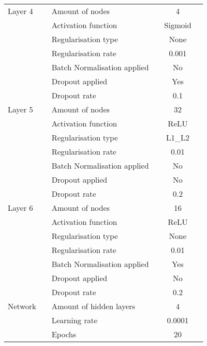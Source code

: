 \documentclass[a4paper,11pt]{report}
\begin{document}
\begin{table}[htbp]
\begin{center}
\begin{tabular}{llllcl}
Layer 4 && Amount of nodes && 4 & \\
        && Activation function && Sigmoid & \\
        && Regularisation type && None & \\
        && Regularisation rate && 0.001 & \\
        && Batch Normalisation applied && No & \\
        && Dropout applied && Yes & \\
        && Dropout rate && 0.1 & \\

Layer 5 && Amount of nodes && 32 & \\
        && Activation function && ReLU & \\
        && Regularisation type && L1\_L2 & \\
        && Regularisation rate && 0.01 & \\
        && Batch Normalisation applied && No & \\
        && Dropout applied && No & \\
        && Dropout rate && 0.2 & \\

Layer 6 && Amount of nodes && 16 & \\
        && Activation function && ReLU & \\
        && Regularisation type && None & \\
        && Regularisation rate && 0.01 & \\
        && Batch Normalisation applied && Yes & \\
        && Dropout applied && No & \\
        && Dropout rate && 0.2 & \\

\midrule
Network && Amount of hidden layers && 4 & \\
        && Learning rate && 0.0001 & \\
        && Epochs && 20 & \\
\bottomrule
\end{tabular}
\end{center}
\end{table}
\end{document}
